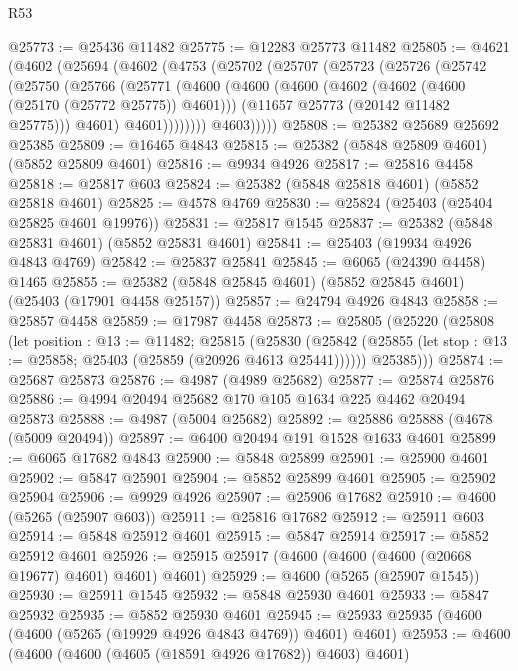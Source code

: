 \begin{lexlean}{R53}
\begin{coremodule}
@25773 := @25436 @11482
@25775 := @12283 @25773 @11482
@25805 := @4621
    (@4602
      (@25694
        (@4602
          (@4753
            (@25702
              (@25707
                (@25723
                  (@25726
                    (@25742
                      (@25750
                        (@25766
                          (@25771
                            (@4600
                              (@4600
                                (@4600
                                  (@4602 (@4602 (@4600 (@25170 (@25772 @25775)) @4601)))
                                  (@11657 @25773 (@20142 @11482 @25775)))
                                @4601)
                              @4601))))))))
              @4603)))))
@25808 := @25382 @25689 @25692 @25385
@25809 := @16465 @4843
@25815 := @25382 (@5848 @25809 @4601) (@5852 @25809 @4601)
@25816 := @9934 @4926
@25817 := @25816 @4458
@25818 := @25817 @603
@25824 := @25382 (@5848 @25818 @4601) (@5852 @25818 @4601)
@25825 := @4578 @4769
@25830 := @25824 (@25403 (@25404 @25825 @4601 @19976))
@25831 := @25817 @1545
@25837 := @25382 (@5848 @25831 @4601) (@5852 @25831 @4601)
@25841 := @25403 (@19934 @4926 @4843 @4769)
@25842 := @25837 @25841
@25845 := @6065 (@24390 @4458) @1465
@25855 := @25382 (@5848 @25845 @4601) (@5852 @25845 @4601) (@25403 (@17901 @4458 @25157))
@25857 := @24794 @4926 @4843
@25858 := @25857 @4458
@25859 := @17987 @4458
@25873 := @25805
    (@25220
      (@25808
        (let position : @13 := @11482;
        @25815
          (@25830
            (@25842 (@25855 (let stop : @13 := @25858; @25403 (@25859 (@20926 @4613 @25441))))))
          @25385)))
@25874 := @25687 @25873
@25876 := @4987 (@4989 @25682)
@25877 := @25874 @25876
@25886 := @4994 @20494 @25682 @170 @105 @1634 @225 @4462 @20494 @25873
@25888 := @4987 (@5004 @25682)
@25892 := @25886 @25888 (@4678 (@5009 @20494))
@25897 := @6400 @20494 @191 @1528 @1633 @4601
@25899 := @6065 @17682 @4843
@25900 := @5848 @25899
@25901 := @25900 @4601
@25902 := @5847 @25901
@25904 := @5852 @25899 @4601
@25905 := @25902 @25904
@25906 := @9929 @4926
@25907 := @25906 @17682
@25910 := @4600 (@5265 (@25907 @603))
@25911 := @25816 @17682
@25912 := @25911 @603
@25914 := @5848 @25912 @4601
@25915 := @5847 @25914
@25917 := @5852 @25912 @4601
@25926 := @25915 @25917 (@4600 (@4600 (@4600 (@20668 @19677) @4601) @4601) @4601)
@25929 := @4600 (@5265 (@25907 @1545))
@25930 := @25911 @1545
@25932 := @5848 @25930 @4601
@25933 := @5847 @25932
@25935 := @5852 @25930 @4601
@25945 := @25933 @25935 (@4600 (@4600 (@5265 (@19929 @4926 @4843 @4769)) @4601) @4601)
@25953 := @4600 (@4600 (@4600 (@4605 (@18591 @4926 @17682)) @4603) @4601)

\end{coremodule}
\end{lexlean}
